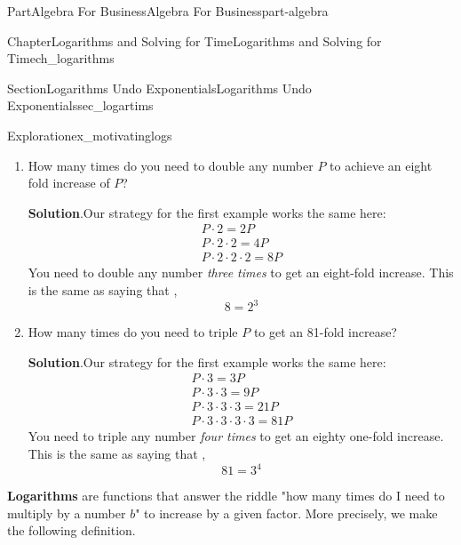 \documentclass{tufte-book}
\newcommand{\blocktitlefont}{\relax}
\newcommand{\terminology}[1]{\textbf{#1}}
\numberwithin{equation}{chapter}
\begin{document}
\begin{partptx}{Part}{Algebra For Business}{}{Algebra For Business}{}{}{part-algebra}
\begin{chapterptx}{Chapter}{Logarithms and Solving for Time}{}{Logarithms and Solving for Time}{}{}{ch_logarithms}
\begin{sectionptx}{Section}{Logarithms Undo Exponentials}{}{Logarithms Undo Exponentials}{}{}{sec_logartims}
\begin{exploration}{Exploration}{}{ex_motivatinglogs}
\begin{enumerate}[font=\bfseries,label=(\alph*),ref=\alph*]
\noindent\textbf{\blocktitlefont Solution}.\hypertarget{ex_motivatinglogs-1-2}{}\quad{}Just start doubling 10, and see what works!%
\begin{gather*}
10 \cdot 2 = 20 \\
10 \cdot 2 \cdot 2 = 40 \\
10 \cdot 2 \cdot 2 \cdot 2 = 80 
\end{gather*}
You need to double 10 \emph{three times} to get from 10 to 80 (an eight-fold increase). In other words,%
\begin{equation*}
80 = 10 \cdot 2^3
\end{equation*}
%
\item{}How many times do you need to double any number \(P\) to achieve an eight fold increase of \(P\)?%
\par\smallskip%
\noindent\textbf{\blocktitlefont Solution}.\hypertarget{ex_motivatinglogs-2-2}{}\quad{}Our strategy for the first example works the same here:%
\begin{gather*}
P \cdot 2 = 2 P \\
P \cdot 2 \cdot 2 = 4 P \\
P \cdot 2 \cdot 2 \cdot 2 = 8 P  
\end{gather*}
You need to double any number \emph{three times} to get an eight-fold increase. This is the same as saying that ,%
\begin{equation*}
8 =  2^3
\end{equation*}
%
\item{}How many times do you need to triple \(P\) to get an 81-fold increase?%
\par\smallskip%
\noindent\textbf{\blocktitlefont Solution}.\hypertarget{ex_motivatinglogs-3-2}{}\quad{}Our strategy for the first example works the same here:%
\begin{gather*}
P \cdot 3 = 3 P \\
P \cdot 3 \cdot 3 = 9 P \\
P \cdot 3\cdot 3 \cdot 3 = 21 P\\
P \cdot 3\cdot 3 \cdot 3 \cdot 3 = 81 P
\end{gather*}
You need to triple any number \emph{four times} to get an eighty one-fold increase. This is the same as saying that ,%
\begin{equation*}
81 =  3^4
\end{equation*}
%
\end{enumerate}%
\end{exploration}%
\terminology{Logarithms} are functions that answer the riddle "how many times do I need to multiply by a number \(b\)" to increase by a given factor. More precisely, we make the following definition.%

\end{sectionptx}
\end{chapterptx}
\end{partptx}
\end{document}
